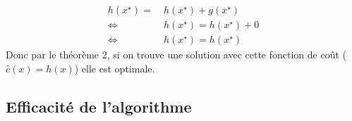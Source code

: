 \documentclass[french]{article}
\newcommand{\xsol}{x^{\star}}
\begin{document}
\begin{enumerate}[label=(\alph*)]
\begin{enumerate}[label=\arabic*)]
	\begin{align*}
		h(\xsol) =&\ h(\xsol) + g(\xsol)\\
		\Longleftrightarrow&\  h(\xsol) = h(\xsol) + 0\\
		\Longleftrightarrow&\ h(\xsol) = h(\xsol)
	\end{align*}
	Donc par le théorème 2, si on trouve une solution avec cette fonction de coût (\(\hat{c}(x) =  h(x)\)) elle est optimale.
\end{enumerate}
\end{enumerate}


\subsection{Efficacité de l'algorithme}
\end{document}
